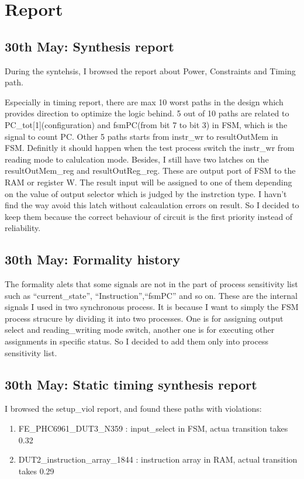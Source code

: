 \chapter{Report}\label{chapter2}
\section{30th May: Synthesis report}
During the syntehsis, I browsed the report about Power, Constraints and Timing path.

Especially in timing report, there are max 10 worst paths in the design which provides direction
to optimize the logic behind.
5 out of 10 paths are related to PC\_tot[1](configuration) and fsmPC(from bit 7 to bit 3) in FSM, which is the signal to count PC.
Other 5 paths starts from instr\_wr to resultOutMem in FSM. Definitly it should happen when the test process switch the instr\_wr from reading mode
to calulcation mode.
Besides, I still have two latches  on the resultOutMem\_reg and resultOutReg\_reg. These are output port of FSM
to the RAM or register W. The result input will be assigned to one of them depending on the value of output selector which is judged 
by the instrction type. I havn't find the way avoid this latch without calcaulation errors on result. So I decided to keep them because
the correct behaviour of circuit is the first priority instead of reliability. 

\section{30th May: Formality history}
The formality alets that some signals are not in the part of process sensitivity list such as ``current\_state'', ``Instruction'',``fsmPC'' and so on.
These are the internal signals I used in two synchronous process. It is because I want to simply the FSM process strucure by dividing it into
two processes. One is for assigning output select and reading\_writing mode switch, another one is for executing other assignments in specific status.
So I decided to add them only into process sensitivity list.

\section{30th May: Static timing synthesis report}
I browsed the setup\_viol report, and found these paths with violations:
\begin{enumerate}
    \item FE\_PHC6961\_DUT3\_N359  : input\_select in FSM,  actua transition takes 0.32
    \item DUT2\_instruction\_array\_1844 : instruction array in RAM, actual transition takes 0.29
\end{enumerate}

